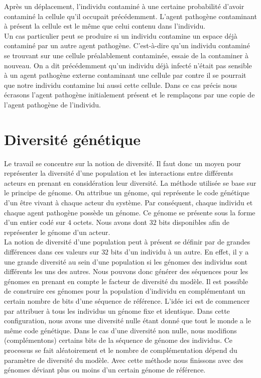 Après un déplacement, l'individu contaminé à une certaine probabilité d'avoir contaminé la cellule qu'il occupait précédemment. L'agent pathogène contaminant à présent la cellule est le même que celui contenu dans l'individu.\\

Un cas particulier peut se produire si un individu contamine un espace déjà contaminé par un autre agent pathogène. C'est-à-dire qu'un individu contaminé se trouvant sur une cellule préalablement contaminée, essaie de la contaminer à nouveau. On a dit précédemment qu'un individu déjà infecté n'était pas sensible à un agent pathogène externe contaminant une cellule par contre il se pourrait que notre individu contamine lui aussi cette cellule. Dans ce cas précis nous écrasons l'agent pathogène initialement présent et le remplaçons par une copie de l'agent pathogène de l'individu.

\section{Diversité génétique}

Le travail se concentre sur la notion de diversité. Il faut donc un moyen pour représenter la diversité d'une population et les interactions entre différents acteurs en prenant en considération leur diversité. La méthode utilisée se base sur le principe de génome. On attribue un génome, qui représente le code génétique d'un être vivant à chaque acteur du système. Par conséquent, chaque individu et chaque agent pathogène possède un génome. Ce génome se présente sous la forme d'un entier codé sur $4$ octets. Nous avons dont $32$ bits disponibles afin de représenter le génome d'un acteur.\\

La notion de diversité d'une population peut à présent se définir par de grandes différences dans ces valeurs sur $32$ bits d'un individu à un autre. En effet, il y a une grande diversité au sein d'une population si les génomes des individus sont différents les uns des autres. Nous pouvons donc générer des séquences pour les génomes en prenant en compte le facteur de diversité du modèle. Il est possible de construire ces génomes pour la population d'individu en complémentant un certain nombre de bits d'une séquence de référence. L'idée ici est de commencer par attribuer à tous les individus un génome fixe et identique. Dans cette configuration, nous avons une diversité nulle étant donné que tout le monde a le même code génétique. Dans le cas d'une diversité non nulle, nous modifions (complémentons) certains bits de la séquence de génome des individus. Ce processus se fait aléatoirement et le nombre de complémentation dépend du paramètre de diversité du modèle. Avec cette méthode nous finissons avec des génomes déviant plus ou moins d'un certain génome de référence.\\


